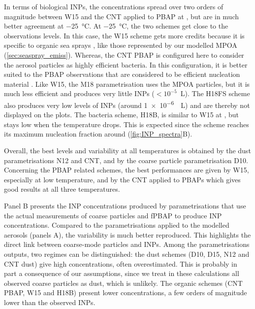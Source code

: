    In terms of biological INPs, the concentrations spread over two orders of magnitude between W15 and the CNT applied to PBAP at , but are in much better agreement at \SI{-25}{\degreeCelsius}. %
   At \SI{-25}{\degreeCelsius}, the two schemes get close to the observations levels. %
   In this case, the W15 scheme gets more credits because it is specific to organic sea sprays \citep{wilson_marine_2015}, like those represented by our modelled MPOA (\cref{sec:seaspray_emiss}). Whereas, the CNT PBAP is configured here to consider the aerosol particles as highly efficient bacteria. In this configuration, it is better suited to the PBAP observations that are considered to be efficient nucleation material \citep[][]{kojoj_arctic_2024}.
   Like W15, the M18 parametrisation uses the MPOA particles, but it is much less efficient and produces very little INPs ($< 10^{-5}$\si{\per\liter}).
   The H18FS scheme also produces very low levels of INPs (around \SI{1e-6}{\per\liter}) and are thereby not displayed on the plots.
   The bacteria scheme, H18B, is similar to W15 at , but stays low when the temperature drops. This is expected since the scheme reaches its maximum nucleation fraction around  (\cref{fig:INP_spectra}B).

   Overall, the best levels and variability at all temperatures is obtained by the dust parametrisations N12 and CNT, and by the coarse particle parametrisation D10. 
   Concerning the PBAP related schemes, the best performances are given by W15, especially at low temperature, and by the CNT applied to PBAPs which gives good results at all three temperatures.
   
   Panel B presents the INP concentrations produced by parametrisations that use the actual measurements of coarse particles and fPBAP to produce INP concentrations.
   Compared to the parametrisations applied to the modelled aerosols (panels A), the variability is much better reproduced. This highlights the direct link between coarse-mode particles and INPs.
   Among the parametrisations outputs, two regimes can be distinguished: the dust schemes (D10, D15, N12 and CNT dust) give high concentrations, often overestimated. This is probably in part a consequence of our assumptions, since we treat in these calculations  all observed coarse particles as dust, which is unlikely. The organic schemes (CNT PBAP, W15 and H18B) present lower concentrations, a few orders of magnitude lower than the observed INPs.
   
